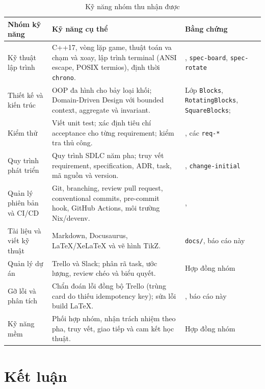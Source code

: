 \documentclass[12pt,a4paper]{article}
\begin{document}
\begin{table}[H]
  \centering
  \small
  \caption{Kỹ năng nhóm thu nhận được}
  \begin{tabularx}{\textwidth}{P{3.0cm} Y P{3.0cm}}
    \toprule
    \textbf{Nhóm kỹ năng} & \textbf{Kỹ năng cụ thể} & \textbf{Bằng chứng} \\
    \midrule
    Kỹ thuật lập trình & C++17, vòng lặp game, thuật toán va chạm và xoay, lập trình terminal (ANSI escape, POSIX termios), định thời \texttt{chrono}. & , \texttt{spec-board}, \texttt{spec-rotate} \\
    Thiết kế và kiến trúc & OOP đa hình cho bảy loại khối; Domain-Driven Design với bounded context, aggregate và invariant. & Lớp \texttt{Blocks}, \texttt{RotatingBlocks}, \texttt{SquareBlocks};  \\
    Kiểm thử & Viết unit test; xác định tiêu chí acceptance cho từng requirement; kiểm tra thủ công. & , các \texttt{req-*} \\
    Quy trình phát triển & Quy trình SDLC năm pha; truy vết requirement, specification, ADR, task, mã nguồn và version. & , \texttt{change-initial} \\
    Quản lý phiên bản và CI/CD & Git, branching, review pull request, conventional commits, pre-commit hook, GitHub Actions, môi trường Nix/devenv. & ,  \\
    Tài liệu và viết kỹ thuật & Markdown, Docusaurus, LaTeX/XeLaTeX và vẽ hình TikZ. & \texttt{docs/}, báo cáo này \\
    Quản lý dự án & Trello và Slack; phân rã task, ước lượng, review chéo và biểu quyết. & Hợp đồng nhóm \\
    Gỡ lỗi và phân tích & Chẩn đoán lỗi đồng bộ Trello (trùng card do thiếu idempotency key); sửa lỗi build LaTeX. & , báo cáo này \\
    Kỹ năng mềm & Phối hợp nhóm, nhận trách nhiệm theo pha, truy vết, giao tiếp và cam kết học thuật. & Hợp đồng nhóm \\
    \bottomrule
  \end{tabularx}
\end{table}

\section{Kết luận}
\end{document}
